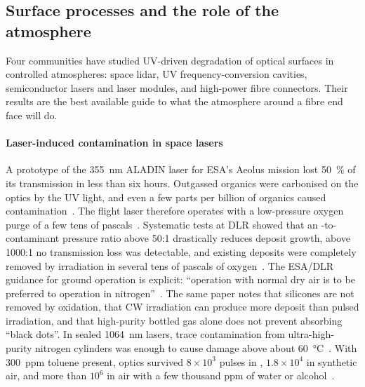 \subsection{Surface processes and the role of the atmosphere}\label{sec:sota-surface}
Four communities have studied UV-driven degradation of optical surfaces in controlled atmospheres:
space lidar, UV frequency-conversion cavities, semiconductor lasers and laser modules, and
high-power fibre connectors. Their results are the best available guide to what the atmosphere around a
fibre end face will do.

\paragraph{Laser-induced contamination in space lasers} A prototype of the \SI{355}{nm} ALADIN laser for
ESA's Aeolus mission lost \SI{50}{\percent} of its transmission in less than six hours. Outgassed organics
were carbonised on the optics by the UV light, and even a few parts per billion of organics caused
contamination~\cite{ESA2018Aeolus}. The flight laser therefore operates with a low-pressure oxygen purge
of a few tens of pascals~\cite{Wernham2010,ESA2018Aeolus}. Systematic tests at DLR showed that an
\Oxy-to-contaminant pressure ratio above 50:1 drastically reduces deposit growth, above 1000:1 no
transmission loss was detectable, and existing deposits were completely removed by irradiation in
several tens of pascals of oxygen~\cite{Hippler2016,Tighe2008,Riede2011,Schroeder2013}. The ESA/DLR
guidance for ground operation is explicit: ``operation with normal dry air is to be preferred to operation
in nitrogen''~\cite{Mondin2017}. The same paper notes that silicones are not removed by oxidation, that CW
irradiation can produce more deposit than pulsed irradiation, and that high-purity bottled gas alone does
not prevent absorbing ``black dots''. In sealed \SI{1064}{nm} lasers, trace contamination from
ultra-high-purity nitrogen cylinders was enough to cause damage above about
\SI{60}{\celsius}~\cite{Hovis1994}. With \SI{300}{ppm} toluene
present, optics survived $8\times10^3$ pulses in \Ntwo, $1.8\times10^4$ in synthetic air, and more than
$10^6$ in air with a few thousand ppm of water or alcohol~\cite{Weiller2010}.

